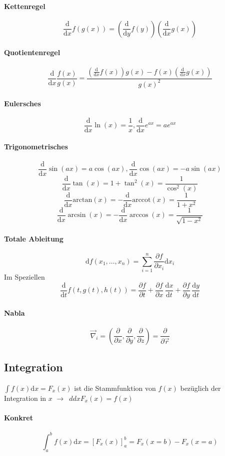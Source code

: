 \documentclass[oneside]{book}
\theoremstyle{definition}
\newcommand{\conseq}{$\rightarrow$~}
\renewcommand{\d}{\mathrm d}
\newcommand{\dd}[1]{\frac{\d}{\d #1}}
\newcommand{\fpartial}[1]{\frac{\partial}{\partial #1}}
\newcommand{\ffpartial}[2]{\frac{\partial #1}{\partial #2}}
\begin{document}
\paragraph{Kettenregel}
$$\dd x f(g(x)) = (\dd y f(y))(\dd x g(x))$$

\paragraph{Quotientenregel}
$$\dd x \frac{f(x)}{g(x)} = \frac{(\dd x f(x))g(x) - f(x)(\dd x g(x))}{g(x)^2}$$

\paragraph{Eulersches}
$$\dd x \ln(x) = \frac1x, \dd x e^{ax} = a e^{ax}$$

\paragraph{Trigonometrisches}
$$\dd x \sin(ax) = a \cos(ax), \dd x \cos(ax) = - a \sin(ax)$$
$$\dd x \tan(x) = 1 + \tan^2(x) = \frac1{\cos^2(x)}$$
$$\dd x \mathrm{arctan}(x) = - \dd x \mathrm{arccot}(x) = \frac{1}{1 + x^2}$$
$$\dd x \arcsin(x) = - \dd x \arccos(x) = \frac1{\sqrt{1 - x^2}}$$

\paragraph{Totale Ableitung}
$$\d f(x_1, \dots, x_n) = \sum_{i = 1}^{n} \ffpartial{f}{x_i} \d x_i$$
Im Speziellen
$$\frac{\mathrm d}{\mathrm dt} f(t,g(t),h(t)) = \frac{\partial f}{\partial t} + \frac{\partial f}{\partial x} \, \frac{\mathrm dx}{\mathrm dt} + \frac{\partial f}{\partial y} \,\frac{\mathrm dy}{\mathrm dt} $$

\paragraph{Nabla}
$$\vec{\nabla}_i = (\fpartial{x}, \fpartial{y}, \fpartial{z}) = \fpartial{\vec{r}}$$

\subsection{Integration}
$\int f(x) \d x = F_x(x)$ ist die Stammfunktion von $f(x)$ bezüglich der Integration in $x$ \conseq $dd x F_x(x) = f(x)$

\paragraph{Konkret}
$$ \int_a^b f(x) \d x = [ F_x(x) ]_a^b = F_x(x = b) - F_x(x = a)$$
\end{document}
